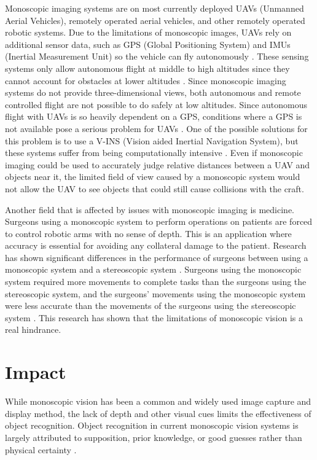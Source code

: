 \documentclass[12pt, journal]{IEEEtran}
\begin{document}
Monoscopic imaging systems are on most currently deployed UAVs (Unmanned Aerial Vehicles), remotely operated aerial vehicles, and other remotely operated robotic systems. Due to the limitations of monoscopic images, UAVs rely on additional sensor data, such as GPS (Global Positioning System) and IMUs (Inertial Measurement Unit) so the vehicle can fly autonomously \cite{sanfourche}. These sensing systems only allow autonomous flight at middle to high altitudes since they cannot account for obstacles at lower altitudes \cite{sanfourche}. Since monoscopic imaging systems do not provide three-dimensional views, both autonomous and remote controlled flight are not possible to do safely at low altitudes. Since autonomous flight with UAVs is so heavily dependent on a GPS, conditions where a GPS is not available pose a serious problem for UAVs \cite{chowdhary}.  One of the possible solutions for this problem is to use a V-INS (Vision aided Inertial Navigation System), but these systems suffer from being computationally intensive \cite{chowdhary}. Even if monoscopic imaging could be used to accurately judge relative distances between a UAV and objects near it, the limited field of view caused by a monoscopic system would not allow the UAV to see objects that could still cause collisions with the craft.

Another field that is affected by issues with monoscopic imaging is medicine. Surgeons using a monoscopic system to perform operations on patients are forced to control robotic arms with no sense of depth. This is an application where accuracy is essential for avoiding any collateral damage to the patient. Research has shown significant differences in the performance of surgeons between using a monoscopic system and a stereoscopic system \cite{munz}. Surgeons using the monoscopic system required more movements to complete tasks than the surgeons using the stereoscopic system, and the surgeons' movements using the monoscopic system were less accurate than the movements of the surgeons using the stereoscopic system \cite{munz}. This research has shown that the limitations of monoscopic vision is a real hindrance.

\section{Impact}
While monoscopic vision has been a common and widely used image capture and display method, the lack of depth and other visual cues limits the effectiveness of object recognition.  Object recognition in current monoscopic vision systems is largely attributed to supposition, prior knowledge, or good guesses rather than physical certainty \cite{westheimer}.
\end{document}
